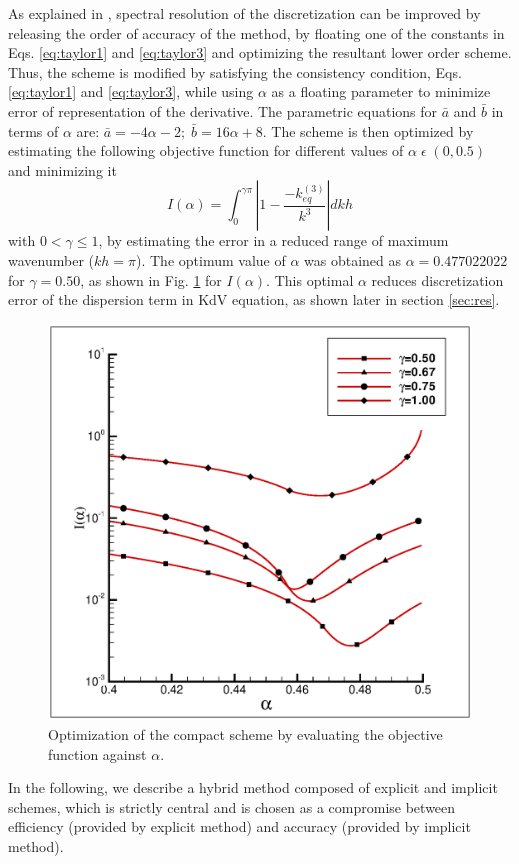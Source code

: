  As explained in \cite{Sengupta2013a,Sengupta2006b}, spectral resolution of the discretization
can be improved by releasing the order of accuracy of the method, by floating one of the constants in Eqs.  \eqref{eq:taylor1} and \eqref{eq:taylor3}
and optimizing the resultant lower order scheme. Thus, the scheme is modified by satisfying the consistency condition, Eqs. \eqref{eq:taylor1} and 
\eqref{eq:taylor3}, while using $\alpha$ as a floating parameter to minimize error of representation of the derivative. The parametric equations for 
$\bar{a}$ and $\bar{b}$ in terms of $\alpha$ are: $ \bar{a}= -4\alpha-2;\; \bar{b}=16\alpha +8$. The scheme is then optimized by estimating the following objective function for different values of $\alpha\; \epsilon\; (0,0.5)$ and minimizing it
\begin{equation}
\label{obj}
I(\alpha) = \int_0^{\gamma\pi} \left| 1 - \frac{-k_{eq}^{(3)}}{k^3} \right| dkh
\end{equation}
with $0<\gamma\leq 1$, by estimating the error in a reduced range of maximum wavenumber ($kh = \pi$). The optimum value of $\alpha$ was obtained as 
$\alpha=0.477022022$ for $\gamma = 0.50$, as shown in Fig. \ref{fig:optim} for $I(\alpha)$. This optimal $\alpha$ reduces discretization error of the dispersion term in KdV equation, as shown later in section \ref{sec:res}. 

\begin{figure}[h!]
\center
\includegraphics[width=0.5\linewidth]{Fig_5}
\caption{Optimization of the compact scheme by evaluating the objective function against $\alpha$.}
\label{fig:optim}
\end{figure}

In the following, we describe a hybrid method composed of explicit and implicit schemes, which is strictly central and is chosen as a compromise between efficiency (provided by explicit method) and accuracy (provided by implicit
method). 


